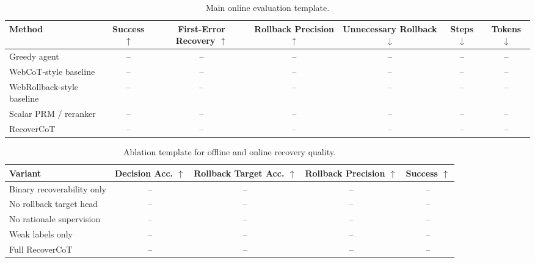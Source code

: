 \documentclass[11pt]{article}
\begin{document}
\begin{table}[t]
\centering
\small
\begin{tabular}{lcccccc}
\toprule
Method & Success $\uparrow$ & First-Error Recovery $\uparrow$ & Rollback Precision $\uparrow$ & Unnecessary Rollback $\downarrow$ & Steps $\downarrow$ & Tokens $\downarrow$ \\
\midrule
Greedy agent & -- & -- & -- & -- & -- & -- \\
WebCoT-style baseline & -- & -- & -- & -- & -- & -- \\
WebRollback-style baseline & -- & -- & -- & -- & -- & -- \\
Scalar PRM / reranker & -- & -- & -- & -- & -- & -- \\
RecoverCoT & -- & -- & -- & -- & -- & -- \\
\bottomrule
\end{tabular}
\caption{Main online evaluation template.}
\label{tab:main-results-template}
\end{table}

\begin{table}[t]
\centering
\small
\begin{tabular}{lcccc}
\toprule
Variant & Decision Acc. $\uparrow$ & Rollback Target Acc. $\uparrow$ & Rollback Precision $\uparrow$ & Success $\uparrow$ \\
\midrule
Binary recoverability only & -- & -- & -- & -- \\
No rollback target head & -- & -- & -- & -- \\
No rationale supervision & -- & -- & -- & -- \\
Weak labels only & -- & -- & -- & -- \\
Full RecoverCoT & -- & -- & -- & -- \\
\bottomrule
\end{tabular}
\caption{Ablation template for offline and online recovery quality.}
\label{tab:ablation-template}
\end{table}


\end{document}
